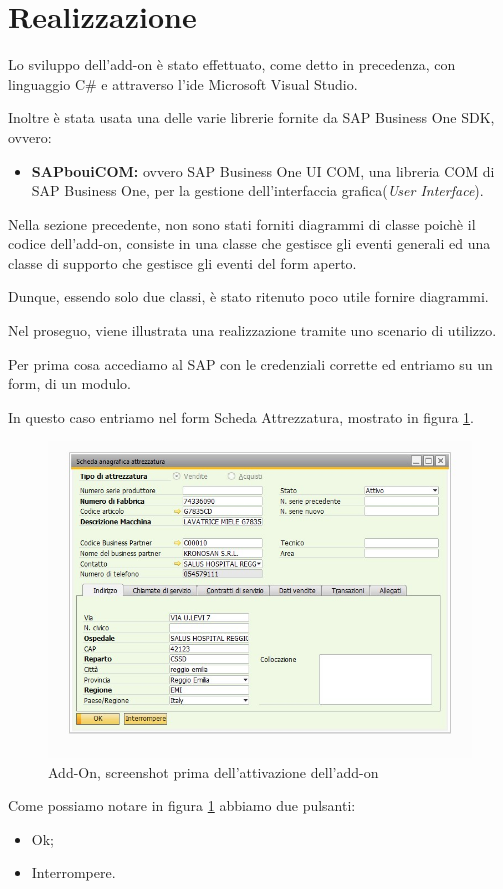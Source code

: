 \newpage

\section{Realizzazione}

	Lo sviluppo dell'add-on è stato effettuato, come detto in precedenza, con linguaggio C\# e attraverso l'\gls{ide} Microsoft Visual Studio.
	
	Inoltre è stata usata una delle varie librerie fornite da SAP Business One SDK, ovvero:
	\begin{itemize}
		\item \textbf{SAPbouiCOM:} ovvero SAP Business One UI COM, una libreria COM di SAP Business One, per la gestione dell'interfaccia grafica(\emph{User Interface}).
	\end{itemize}
	Nella sezione precedente, non sono stati forniti diagrammi di classe poichè il codice dell'add-on, consiste in una classe che gestisce gli eventi generali ed una classe di supporto che gestisce gli eventi del form aperto.
	
	Dunque, essendo solo due classi, è stato ritenuto poco utile fornire diagrammi.
	
	\vspace{1em}
	Nel proseguo, viene illustrata una realizzazione tramite uno scenario di utilizzo.


	Per prima cosa accediamo al SAP con le credenziali corrette ed entriamo su un form, di un modulo.
	
	In questo caso entriamo nel form Scheda Attrezzatura, mostrato in figura \ref{fig:4-4}.
	

\begin{figure}[!h] 
	\centering 
	\includegraphics[scale = 0.6]{immagini/add-on/addon-scheda-nobutton.jpg} 
	\caption{Add-On, screenshot prima dell'attivazione dell'add-on}
	\label{fig:4-4}
\end{figure}
Come possiamo notare in figura \ref{fig:4-4} abbiamo due pulsanti:
\begin{itemize}
	\item Ok;
	\item Interrompere.
\end{itemize}


